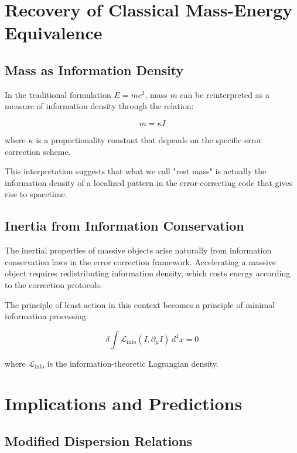 \documentclass[12pt]{article}
\begin{document}
\section{Recovery of Classical Mass-Energy Equivalence}

\subsection{Mass as Information Density}

In the traditional formulation $E = mc^2$, mass $m$ can be reinterpreted as a measure of information density through the relation:

\begin{equation}
m = \kappa I
\end{equation}

where $\kappa$ is a proportionality constant that depends on the specific error correction scheme.

This interpretation suggests that what we call "rest mass" is actually the information density of a localized pattern in the error-correcting code that gives rise to spacetime.

\subsection{Inertia from Information Conservation}

The inertial properties of massive objects arise naturally from information conservation laws in the error correction framework. Accelerating a massive object requires redistributing information density, which costs energy according to the correction protocols.

The principle of least action in this context becomes a principle of minimal information processing:

\begin{equation}
\delta \int \mathcal{L}_{\text{info}}(I, \partial_\mu I) \, d^4x = 0
\end{equation}

where $\mathcal{L}_{\text{info}}$ is the information-theoretic Lagrangian density.

\section{Implications and Predictions}

\subsection{Modified Dispersion Relations}
\end{document}
